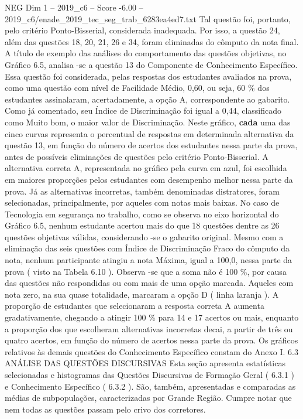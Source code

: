 \begin{textsample}{NEG Dim 1 – 2019\_c6 – Score -6.00 – 2019\_c6/enade\_2019\_tec\_seg\_trab\_6283ea4ed7.txt}
Tal questão foi, portanto, pelo critério Ponto-Bisserial, considerada inadequada.
Por isso, a questão 24, além das questões 18, 20, 21, 26 e 34, foram eliminadas do cômputo da nota final.
A título de exemplo das análises do comportamento das questões objetivas, no Gráfico 6.5, analisa -se a questão 13 do Componente de Conhecimento Específico.
Essa questão foi considerada, pelas respostas dos estudantes avaliados na prova, como uma questão com nível de Facilidade Médio, 0,60, ou seja, 60 \% dos estudantes assinalaram, acertadamente, a opção A, correspondente ao gabarito.
Como já comentado, seu Índice de Discriminação foi igual a 0,44, classificado como Muito bom, o maior valor de Discriminação.
Neste gráfico, \textbf{cada} uma das cinco curvas representa o percentual de respostas em determinada alternativa da questão 13, em função do número de acertos dos estudantes nessa parte da prova, antes de possíveis eliminações de questões pelo critério Ponto-Bisserial.
A alternativa correta A, representada no gráfico pela curva em azul, foi escolhida em maiores proporções pelos estudantes com desempenho melhor nessa parte da prova.
Já as alternativas incorretas, também denominadas distratores, foram selecionadas, principalmente, por aqueles com notas mais baixas.
No caso de Tecnologia em segurança no trabalho, como se observa no eixo horizontal do Gráfico 6.5, nenhum estudante acertou mais do que 18 questões dentre as 26 questões objetivas válidas, considerando -se o gabarito original.
Mesmo com a eliminação das seis questões com Índice de Discriminação Fraco do cômputo da nota, nenhum participante atingiu a nota Máxima, igual a 100,0, nessa parte da prova ( visto na Tabela 6.10 ).
Observa -se que a soma não é 100 \%, por causa das questões não respondidas ou com mais de uma opção marcada.
Aqueles com nota zero, na sua quase totalidade, marcaram a opção D ( linha laranja ).
A proporção de estudantes que selecionaram a resposta correta A aumenta gradativamente, chegando a atingir 100 \% para 14 e 17 acertos ou mais, enquanto a proporção dos que escolheram alternativas incorretas decai, a partir de três ou quatro acertos, em função do número de acertos nessa parte da prova.
Os gráficos relativos às demais questões do Conhecimento Específico constam do Anexo I. 6.3 ANÁLISE DAS QUESTÕES DISCURSIVAS Esta seção apresenta estatísticas selecionadas e histogramas das Questões Discursivas de Formação Geral ( 6.3.1 ) e Conhecimento Específico ( 6.3.2 ).
São, também, apresentadas e comparadas as médias de subpopulações, caracterizadas por Grande Região.
Cumpre notar que nem todas as questões passam pelo crivo dos corretores.

\end{textsample}
